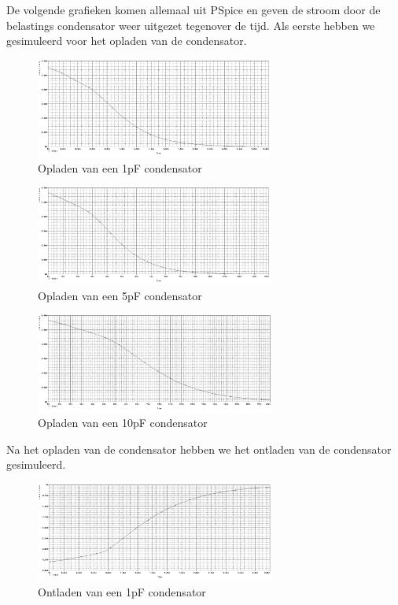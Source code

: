 \documentclass{article}
\begin{document}
De volgende grafieken komen allemaal uit PSpice en geven de stroom door de belastings condensator weer uitgezet tegenover de tijd. Als eerste hebben we gesimuleerd voor het opladen van de condensator.

\begin{figure}[H]
	\centering
	\includegraphics[width=0.7\textwidth]{opladen1p}
	\caption{Opladen van een 1pF condensator}
\end{figure}

\begin{figure}[H]
	\centering
	\includegraphics[width=0.7\textwidth]{opladen5p}
	\caption{Opladen van een 5pF condensator}
\end{figure}

\begin{figure}[H]
	\centering
	\includegraphics[width=0.7\textwidth]{opladen10p}
	\caption{Opladen van een 10pF condensator}
\end{figure}

Na het opladen van de condensator hebben we het ontladen van de condensator gesimuleerd.

\begin{figure}[H]
	\centering
	\includegraphics[width=0.7\textwidth]{ontladen1p}
	\caption{Ontladen van een 1pF condensator}
\end{figure}
\end{document}
